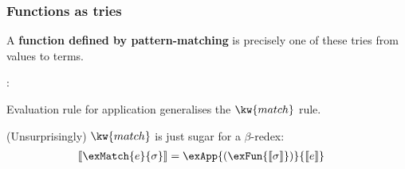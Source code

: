 \begin{frame}[t]
\frametitle{Functions as tries}

\vspace{10pt}
A \textbf{function defined by pattern-matching} is precisely one of
these tries from values to terms.

\begin{smathpar}
{
   \Gamma \vdash \exFun{\sigma} : 
}
\end{smathpar}
Evaluation rule for application generalises the $\kw{match}$ rule.

\vspace{8pt}
\pause (Unsurprisingly) $\kw{match}$ is just sugar for a $\beta$-redex:
{\small
\begin{align*}
\desugar{\exMatch{e}{\sigma}}
&=
\exApp{(\exFun{\desugar{\sigma}})}{\desugar{e}}
\end{align*}
}
\end{frame}
